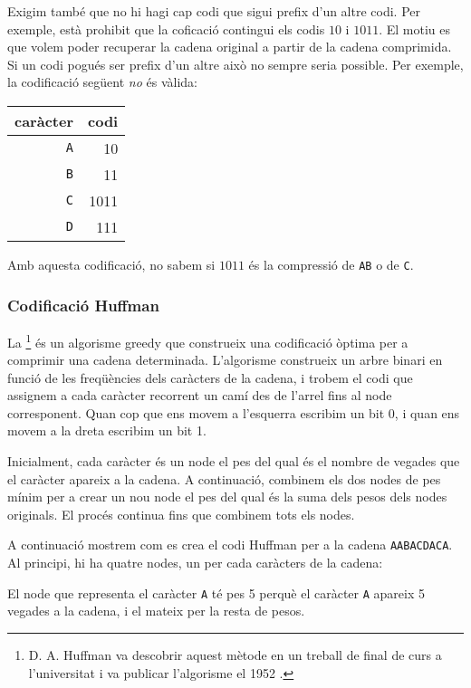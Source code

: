 Exigim també que no hi hagi cap codi que sigui
prefix d'un altre codi.
Per exemple, està prohibit que la coficació
contingui els codis $10$ i $1011$.
El motiu es que volem
poder recuperar la cadena original
a partir de la cadena comprimida.
Si un codi pogués ser prefix d'un altre
això no sempre seria possible.
Per exemple, la codificació següent \emph{no} és vàlida:
\begin{centre}
\begin{tabular}{rr}
caràcter & codi \\
\hline
\texttt{A} & 10 \\
\texttt{B} & 11 \\
\texttt{C} & 1011 \\
\texttt{D} & 111 \\
\end{tabular}
\end{centre}
Amb aquesta codificació, no sabem si $1011$ és la compressió
de \texttt{AB} o de \texttt{C}.


\subsubsection{Codificació Huffman}

La \footnote{D. A. Huffman va descobrir
aquest mètode en un treball de final de curs a l'universitat
i va publicar l'algorisme el 1952 \cite{huf52}.} és un algorisme
greedy que construeix una codificació òptima per
a comprimir una cadena determinada.
L'algorisme construeix un arbre binari
en funció de les freqüències dels caràcters
de la cadena,
i trobem el codi que assignem a cada caràcter
recorrent un camí des de l'arrel fins al node
corresponent.
Quan cop que ens movem a l'esquerra escribim un bit 0,
i quan ens movem a la dreta escribim un bit 1.

Inicialment, cada caràcter és un node el pes del qual és el
nombre de vegades que el caràcter apareix a la cadena.
A continuació, combinem els dos nodes de pes mínim
per a crear un nou node el pes del qual és la suma dels
pesos dels nodes originals.
El procés continua fins que combinem tots els nodes.

A continuació mostrem com es crea el codi Huffman
per a la cadena \texttt{AABACDACA}.
Al principi, hi ha quatre nodes, un per cada caràcters
de la cadena:

\begin{center}
\end{center}
El node que representa el caràcter \texttt{A}
té pes 5 perquè el caràcter \texttt{A}
apareix 5 vegades a la cadena, i el mateix per la
resta de pesos.

